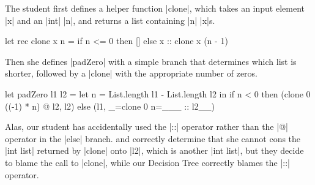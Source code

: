 The student first defines a helper function |clone|, which takes an
input element |x| and an |int| |n|, and returns a list containing |n|
|x|s.
%
\begin{ecode}
  let rec clone x n =
    if n <= 0 then
      []
    else
      x :: clone x (n - 1)
\end{ecode}
%
Then she defines |padZero| with a simple branch that determines which
list is shorter, followed by a |clone| with the appropriate number of
zeros.
%
\lstset{firstnumber=last}
\begin{ecode}
  let padZero l1 l2 =
    let n = List.length l1 - List.length l2 in
    if n < 0 then
      (clone 0 ((-1) * n) @ l2, l2)
    else
      (l1, _=clone 0 n=___ :: l2__)
\end{ecode}
\lstset{firstnumber=1}
%
Alas, our student has accidentally used the |::| operator rather than
the |@| operator in the |else| branch.
%
\sherrloc and \ocaml correctly determine that she cannot cons the
|int list| returned by |clone| onto |l2|, which is another |int list|,
but they decide to blame the call to |clone|, while our Decision
Tree correctly blames the |::| operator.
%





